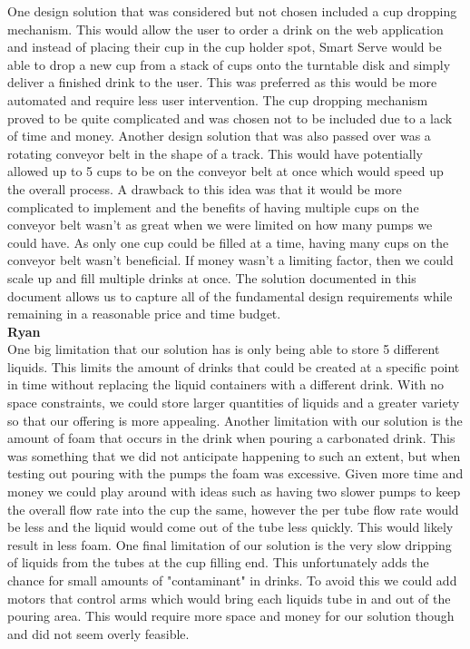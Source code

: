 \documentclass[12pt, titlepage]{article}
\begin{document}
\noindent{}One design solution that was considered but not chosen included a cup dropping mechanism. This would allow the user to order a drink on the web application and instead of placing their cup in the cup holder spot, Smart Serve would be able to drop a new cup from a stack of cups onto the turntable disk and simply deliver a finished drink to the user. This was preferred as this would be more automated and require less user intervention. The cup dropping mechanism proved to be quite complicated and was chosen not to be included due to a lack of time and money. Another design solution that was also passed over was a rotating conveyor belt in the shape of a track. This would have potentially allowed up to 5 cups to be on the conveyor belt at once which would speed up the overall process. A drawback to this idea was that it would be more complicated to implement and the benefits of having multiple cups on the conveyor belt wasn't as great when we were limited on how many pumps we could have. As only one cup could be filled at a time, having many cups on the conveyor belt wasn't beneficial. If money wasn't a limiting factor, then we could scale up and fill multiple drinks at once. The solution documented in this document allows us to capture all of the fundamental design requirements while remaining in a reasonable price and time budget.\\


\textbf{Ryan}\\
One big limitation that our solution has is only being able to store 5 different liquids. This limits the amount of drinks that could be created at a specific point in time without replacing the liquid containers with a different drink. With no space constraints, we could store larger quantities of liquids and a greater variety so that our offering is more appealing. Another limitation with our solution is the amount of foam that occurs in the drink when pouring a carbonated drink. This was something that we did not anticipate happening to such an extent, but when testing out pouring with the pumps the foam was excessive. Given more time and money we could play around with ideas such as having two slower pumps to keep the overall flow rate into the cup the same, however the per tube flow rate would be less and the liquid would come out of the tube less quickly. This would likely result in less foam. One final limitation of our solution is the very slow dripping of liquids from the tubes at the cup filling end. This unfortunately adds the chance for small amounts of "contaminant" in drinks. To avoid this we could add motors that control arms which would bring each liquids tube in and out of the pouring area. This would require more space and money for our solution though and did not seem overly feasible. \\
\end{document}
